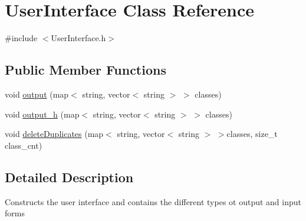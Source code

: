 \hypertarget{class_user_interface}{\section{User\-Interface Class Reference}
\label{class_user_interface}
}


{\ttfamily \#include $<$User\-Interface.\-h$>$}

\subsection*{Public Member Functions}
\begin{DoxyCompactItemize}
\item 
void \hyperlink{class_user_interface_a13170d15472392870c9a9863360a5423}{output} (map$<$ string, vector$<$ string $>$ $>$ classes)
\item 
void \hyperlink{class_user_interface_a4d719c7a1ad8c8cf653c688ab50cc9c3}{output\-\_\-h} (map$<$ string, vector$<$ string $>$ $>$ classes)
\item 
void \hyperlink{class_user_interface_aa15d90714deb218022d3754bddd93852}{delete\-Duplicates} (map$<$ string, vector$<$ string $>$ $>$classes, size\-\_\-t class\-\_\-cnt)
\end{DoxyCompactItemize}


\subsection{Detailed Description}
Constructs the user interface and contains the different types ot output and input forms 

